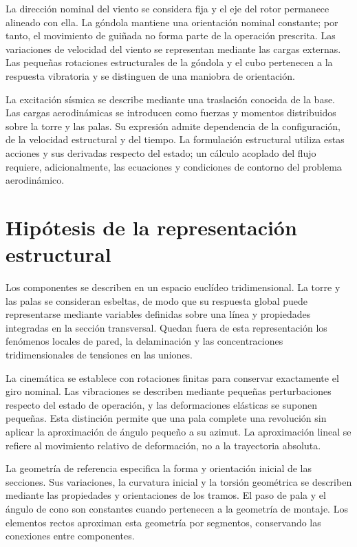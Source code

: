 La dirección nominal del viento se considera fija y el eje del rotor permanece alineado con ella. La góndola mantiene una orientación nominal constante; por tanto, el movimiento de guiñada no forma parte de la operación prescrita. Las variaciones de velocidad del viento se representan mediante las cargas externas. Las pequeñas rotaciones estructurales de la góndola y el cubo pertenecen a la respuesta vibratoria y se distinguen de una maniobra de orientación.

La excitación sísmica se describe mediante una traslación conocida de la base. Las cargas aerodinámicas se introducen como fuerzas y momentos distribuidos sobre la torre y las palas. Su expresión admite dependencia de la configuración, de la velocidad estructural y del tiempo. La formulación estructural utiliza estas acciones y sus derivadas respecto del estado; un cálculo acoplado del flujo requiere, adicionalmente, las ecuaciones y condiciones de contorno del problema aerodinámico.

\section{Hipótesis de la representación estructural}
Los componentes se describen en un espacio euclídeo tridimensional. La torre y las palas se consideran esbeltas, de modo que su respuesta global puede representarse mediante variables definidas sobre una línea y propiedades integradas en la sección transversal. Quedan fuera de esta representación los fenómenos locales de pared, la delaminación y las concentraciones tridimensionales de tensiones en las uniones.

La cinemática se establece con rotaciones finitas para conservar exactamente el giro nominal. Las vibraciones se describen mediante pequeñas perturbaciones respecto del estado de operación, y las deformaciones elásticas se suponen pequeñas. Esta distinción permite que una pala complete una revolución sin aplicar la aproximación de ángulo pequeño a su azimut. La aproximación lineal se refiere al movimiento relativo de deformación, no a la trayectoria absoluta.

La geometría de referencia especifica la forma y orientación inicial de las secciones. Sus variaciones, la curvatura inicial y la torsión geométrica se describen mediante las propiedades y orientaciones de los tramos. El paso de pala y el ángulo de cono son constantes cuando pertenecen a la geometría de montaje. Los elementos rectos aproximan esta geometría por segmentos, conservando las conexiones entre componentes.
